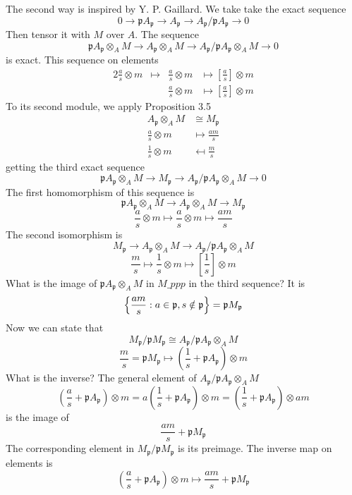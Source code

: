 \documentclass{article}
\newcommand{\mf}{\mathfrak}
\newcommand{\ppp}{\mf p}
\begin{document}
The second way is inspired by Y. P. Gaillard.
We take take the exact sequence
\[
0 \rightarrow \ppp A_\ppp \rightarrow A_\ppp \rightarrow A_\ppp/\ppp A_\ppp \rightarrow 0
\]
Then tensor it with $M$ over $A$. The sequence
\[
\ppp A_\ppp \otimes_A M \rightarrow A_\ppp \otimes_A M \rightarrow A_\ppp / \ppp A_\ppp \otimes_A M \rightarrow 0
\]
is exact. This sequence on elements
\begin{alignat*}{2}
\frac{a}{s} \otimes m 
  & \mapsto  
  & \frac{a}{s} \otimes m 
  & \mapsto 
    \left[ \frac{a}{s} \right] \otimes m \\
&& \frac{a}{s} \otimes m  
  & \mapsto 
    \left[ \frac{a}{s} \right] \otimes m
\end{alignat*}
To its second module, we apply Proposition 3.5
\begin{align*}
A_\ppp \otimes_A M & \cong M_\ppp \\
\frac{a}{s} \otimes m & \mapsto \frac{am}{s} \\
\frac{1}{s} \otimes m & \mapsfrom \frac{m}{s}
\end{align*}
getting the third exact sequence
\[
\ppp A_\ppp \otimes_A M \rightarrow M_\ppp \rightarrow A_\ppp / \ppp A_\ppp \otimes_A M \rightarrow 0
\]
The first homomorphism of this sequence is
\[
\ppp A_\ppp \otimes_A M \rightarrow A_\ppp \otimes_A M \rightarrow M_\ppp
\]
\[
\frac{a}{s}\otimes m \mapsto \frac{a}{s}\otimes m \mapsto \frac{am}{s} 
\]
The second isomorphism is
\[
M_\ppp \rightarrow A_\ppp \otimes_A M \rightarrow A_\ppp/\ppp A_\ppp \otimes_A M
\]
\[
\frac{m}{s} \mapsto \frac{1}{s} \otimes m \mapsto \left[ \frac{1}{s} \right] \otimes m
\]
What is the image of $\ppp A_\ppp \otimes_A M$ in $M\_ppp$ in the third sequence? It is
\[
\Bigl\{ \frac{am}{s}: a \in \ppp, s \notin \ppp  \Bigr\} = \ppp M_\ppp
\]
Now we can state that
\[
M_\ppp/\ppp M_\ppp \cong A_\ppp/\ppp A_\ppp \otimes_A M
\]
\[
\frac{m}{s} = \ppp M_\ppp \mapsto \left(\frac{1}{s} + \ppp A_\ppp \right) \otimes m
\]
What is the inverse? The general element of $A_\ppp/\ppp A_\ppp \otimes_A M$ 
\[
\left( \frac{a}{s} + \ppp A_\ppp \right) \otimes m = a \left( \frac{1}{s} + \ppp A_\ppp \right) \otimes m = \left( \frac{1}{s} + \ppp A_\ppp \right) \otimes am
\]
is the image of
\[
\frac{am}{s} + \ppp M_\ppp
\]
The corresponding element in $M_\ppp/\ppp M_\ppp$ is its preimage. The inverse map on elements is
\[
\left( \frac{a}{s} + \ppp A_\ppp \right) \otimes m \mapsto \frac{am}{s} + \ppp M_\ppp
\]
\end{document}
